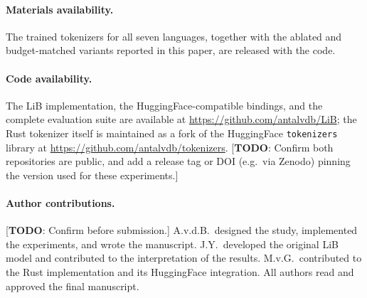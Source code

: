 \documentclass[pdflatex,sn-apa]{sn-jnl}
\newcommand{\todo}[1]{\textcolor{todocolor}{[\textbf{TODO}: #1]}}
\begin{document}
\paragraph{Materials availability.}
The trained tokenizers for all seven languages, together with the ablated and
budget-matched variants reported in this paper, are released with the code.

\paragraph{Code availability.}
The LiB implementation, the HuggingFace-compatible bindings, and the complete
evaluation suite are available at \url{https://github.com/antalvdb/LiB}; the
Rust tokenizer itself is maintained as a fork of the HuggingFace
\texttt{tokenizers} library at \url{https://github.com/antalvdb/tokenizers}.
\todo{Confirm both repositories are public, and add a release tag or DOI
(e.g.\ via Zenodo) pinning the version used for these experiments.}

\paragraph{Author contributions.}
\todo{Confirm before submission.} A.v.d.B.\ designed the study, implemented
the experiments, and wrote the manuscript. J.Y.\ developed the original LiB
model and contributed to the interpretation of the results. M.v.G.\
contributed to the Rust implementation and its HuggingFace integration. All
authors read and approved the final manuscript.


\end{document}
